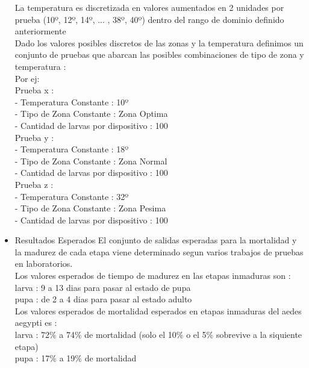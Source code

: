 \documentclass[a4paper]{article}
\begin{document}
\begin{itemize}
La temperatura es discretizada en valores aumentados en 2 unidades por 
prueba (10º, 12º, 14º, ... , 38º, 40º) dentro del rango de dominio definido
anteriormente \\

Dado los valores posibles discretos de las zonas y la temperatura definimos
un conjunto de pruebas que abarcan las posibles combinaciones de tipo 
de zona y temperatura : \\

Por ej: \\

Prueba x : \\
	- Temperatura Constante : 10º\\
	- Tipo de Zona Constante : Zona Optima\\
	- Cantidad de larvas por dispositivo : 100\\

Prueba y :\\
	- Temperatura Constante : 18º\\
	- Tipo de Zona Constante : Zona Normal\\
	- Cantidad de larvas por dispositivo : 100 \\

Prueba z : \\
	- Temperatura Constante : 32º \\
	- Tipo de Zona Constante : Zona Pesima\\
	- Cantidad de larvas por dispositivo : 100\\


\item Resultados Esperados 
El conjunto de salidas esperadas para la mortalidad y la madurez de cada
etapa viene determinado segun varios trabajos de pruebas en laboratorios. \\ 

Los valores esperados de tiempo de madurez en las etapas inmaduras son :\\
larva : 9 a 13 dias para pasar al estado de pupa\\
pupa : de 2 a 4 dias para pasar al estado adulto\\

Los valores esperados de mortalidad esperados en etapas inmaduras del
aedes aegypti es :\\
larva : 72\% a 74\% de mortalidad (solo el 10\% o el 5\% sobrevive a la siquiente
etapa)\\
pupa : 17\% a 19\% de mortalidad  \\


\end{itemize}
\end{document}
